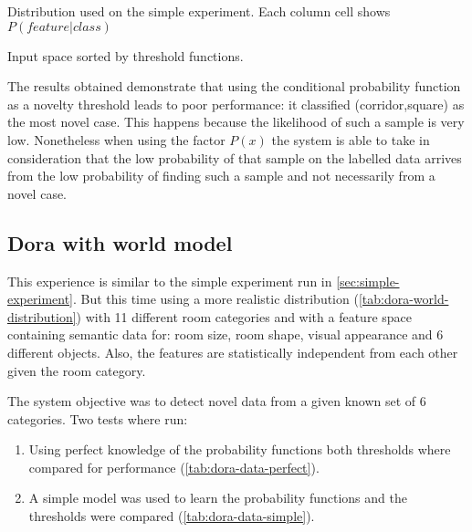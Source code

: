 \documentclass[a4paper]{article}
\begin{document}
\begin{table}[hb]
\begin{center}

\end{center}
\caption{\label{tab:simple-distribution}Distribution used on the simple experiment. Each column cell shows $P(feature|class)$}
\end{table}

\begin{table}
\centering
{}
\qquad
{}
\caption{\label{tab:simple-data-sorted}Input space sorted by threshold functions.}
\end{table}

The results obtained demonstrate that using the conditional probability function
as a novelty threshold leads to poor performance: it classified (corridor,square) as
the most novel case.
This happens because the likelihood of such a sample is very low.
Nonetheless when using the factor $P(x)$ the system is able to take in consideration
that the low probability of that sample on the labelled data arrives from the low
probability of finding such a sample and not necessarily from a novel case.



\subsection{Dora with world model}
\label{sec:dora-experiment}

This experience is similar to the simple experiment run in \autoref{sec:simple-experiment}.
But this time using a more realistic distribution (\autoref{tab:dora-world-distribution}) with
11 different room categories and with a feature space containing semantic data for:
room size, room shape, visual appearance and 6 different objects.
Also, the features are statistically independent from each other given the room category.

The system objective was to detect novel data from a given known set of 6 categories.
Two tests where run:
\begin{enumerate}
\item Using perfect knowledge of the probability functions both thresholds where compared for performance (\autoref{tab:dora-data-perfect}).
\item A simple model was used to learn the probability functions and the thresholds were compared (\autoref{tab:dora-data-simple}).
\end{enumerate}
\end{document}
